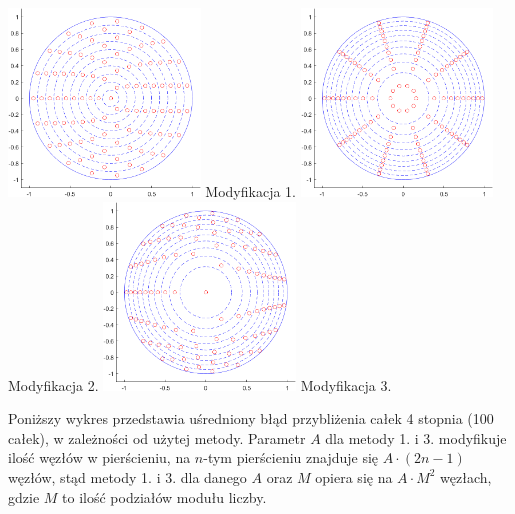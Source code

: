 \documentclass[a4paper,12pt]{article}
\begin{document}
\begin{multicols}{3}
    \small
    \centering
    \includegraphics[height=5cm]{mod1.png}
     \small
    Modyfikacja 1.
    \includegraphics[height=5cm]{mod2.png}
     \small
    Modyfikacja 2.
    \includegraphics[height=5cm]{mod3.png}
     \small
    Modyfikacja 3.
\end{multicols}

\break

    Poniższy wykres przedstawia uśredniony błąd przybliżenia całek 4 stopnia (100 całek), w zależności od użytej metody. Parametr $A$ dla  metody 1. i 3. modyfikuje ilość węzłów w pierścieniu, na $n$-tym pierścieniu znajduje się $A\cdot(2n-1)$ węzłów, stąd metody 1. i 3. dla danego $A$ oraz $M$ opiera się na $A\cdot M^2$ węzłach, gdzie $M$ to ilość podziałów modułu liczby.
    
\end{document}
